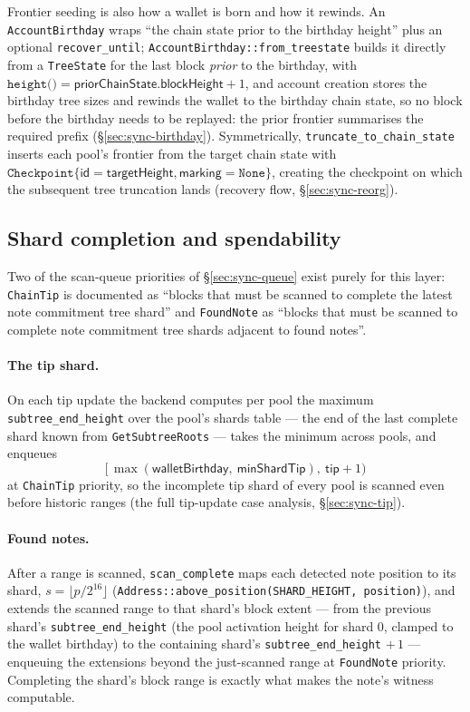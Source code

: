 \documentclass[11pt,a4paper]{article}
\theoremstyle{definition}
\begin{document}
Frontier seeding is also how a wallet is born and how it rewinds. An
\texttt{AccountBirthday} wraps ``the chain state prior to the birthday
height'' plus an optional \texttt{recover\_until};
\texttt{AccountBirthday::}\allowbreak\texttt{from\_treestate} builds it
directly from a
\texttt{TreeState} for the last block \emph{prior} to the birthday, with
$\texttt{height()} = \mathsf{priorChainState}.\mathsf{blockHeight} + 1$,
and account creation stores the birthday tree sizes and rewinds the
wallet to the birthday chain state, so no block before the birthday
needs to be replayed: the prior frontier summarises the required prefix
(\S\ref{sec:sync-birthday}). Symmetrically,
\texttt{truncate\_to\_chain\_state} inserts each pool's frontier from
the target chain state with
$\texttt{Checkpoint}\{\mathsf{id} = \mathsf{targetHeight},
\mathsf{marking} = \texttt{None}\}$, creating the checkpoint on which the
subsequent tree truncation lands
(recovery flow, \S\ref{sec:sync-reorg}).

\subsection{Shard completion and spendability}
\label{sec:sync-tree-witness}

Two of the scan-queue priorities of \S\ref{sec:sync-queue} exist purely
for this layer: \texttt{ChainTip} is documented as ``blocks that must be
scanned to complete the latest note commitment tree shard'' and
\texttt{FoundNote} as ``blocks that must be scanned to complete note
commitment tree shards adjacent to found notes''.

\paragraph{The tip shard.} On each tip update the backend computes per
pool the maximum \texttt{subtree\_}\allowbreak\texttt{end\_height} over
the pool's shards
table --- the end of the last complete shard known from
\texttt{GetSubtreeRoots} --- takes the minimum across pools, and
enqueues
\[
\bigl[\,\max(\mathsf{walletBirthday},\ \mathsf{minShardTip}),\
\mathsf{tip} + 1\bigr)
\]
at \texttt{ChainTip} priority, so the incomplete tip shard of every pool
is scanned even before historic ranges
(the full
tip-update case
analysis, \S\ref{sec:sync-tip}).

\paragraph{Found notes.} After a range is scanned,
\texttt{scan\_complete} maps each detected note position to its shard,
$s = \lfloor p / 2^{16} \rfloor$
(\texttt{Address::above\_position(SHARD\_HEIGHT, position)}), and
extends the scanned range to that shard's block extent --- from the
previous shard's \texttt{subtree\_end\_height} (the pool activation
height for shard $0$, clamped to the wallet birthday) to the containing
shard's \texttt{subtree\_end\_height} $+\,1$ --- enqueuing the
extensions beyond the just-scanned range at \texttt{FoundNote} priority.
Completing the shard's block range is exactly what makes the note's
witness computable.
\end{document}
